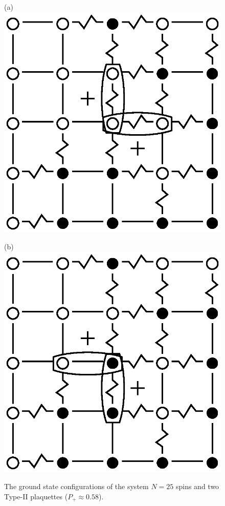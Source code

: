 \documentclass[preprint,12pt]{elsarticle}
\begin{document}
	\begin{figure}[H]
		\centering
		\begin{minipage}[h]{0.25\linewidth}
			\centering(a)
			\includegraphics[width=1\linewidth]{pictures/Cl5x5_Type2_gs1.eps}
		\end{minipage}
		\hspace{15pt}
		\begin{minipage}[h]{0.25\linewidth}
			\centering(b)
			\includegraphics[width=1\linewidth]{pictures/Cl5x5_Type2_gs2.eps}
		\end{minipage}
		\caption{The ground state configurations of the system $N=25$ spins and two Type-II plaquettes ($P_+\approx0.58$).}
		\label{fig:5x5.22F}
	\end{figure}
	
\end{document}
